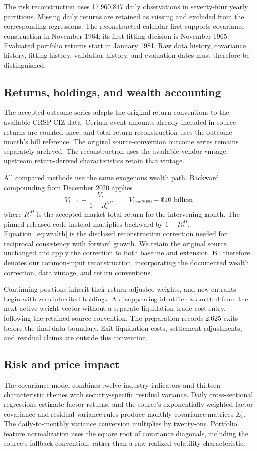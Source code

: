 \documentclass[12pt,letterpaper,fleqn]{article}
\begin{document}
The risk reconstruction uses 17,960,847 daily observations in seventy-four yearly partitions. Missing daily returns are retained as missing and excluded from the corresponding regressions. The reconstructed calendar first supports covariance construction in November 1964; its first fitting decision is November 1965. Evaluated portfolio returns start in January 1981. Raw data history, covariance history, fitting history, validation history, and evaluation dates must therefore be distinguished.

\subsection{Returns, holdings, and wealth accounting}
The accepted outcome series adapts the original return conventions to the available CRSP CIZ data. Certain event amounts already included in source returns are counted once, and total-return reconstruction uses the outcome month's bill reference. The original source-convention outcome series remains separately archived. The reconstruction uses the available vendor vintage; upstream return-derived characteristics retain that vintage.

All compared methods use the same exogenous wealth path. Backward compounding from December 2020 applies
\begin{equation}\label{eq:wealth}
 V_{t-1}=\frac{V_t}{1+R^{M}_t},\qquad V_{\mathrm{Dec\,2020}}=\$10\text{ billion}
\end{equation}
where $R^{M}_t$ is the accepted market total return for the intervening month. The pinned released code instead multiplies backward by $1-R^{M}_t$. Equation~\eqref{eq:wealth} is the disclosed reconstruction correction needed for reciprocal consistency with forward growth. We retain the original source unchanged and apply the correction to both baseline and extension. B1 therefore denotes our common-input reconstruction, incorporating the documented wealth correction, data vintage, and return conventions.

Continuing positions inherit their return-adjusted weights, and new entrants begin with zero inherited holdings. A disappearing identifier is omitted from the next active weight vector without a separate liquidation-trade cost entry, following the retained source convention. The preparation records 2,625 exits before the final data boundary. Exit-liquidation costs, settlement adjustments, and residual claims are outside this convention.

\subsection{Risk and price impact}
The covariance model combines twelve industry indicators and thirteen characteristic themes with security-specific residual variance. Daily cross-sectional regressions estimate factor returns, and the source's exponentially weighted factor covariance and residual-variance rules produce monthly covariance matrices $\Sigma_t$. The daily-to-monthly variance conversion multiplies by twenty-one. Portfolio feature normalization uses the square root of covariance diagonals, including the source's fallback convention, rather than a raw realized-volatility characteristic.
\end{document}
